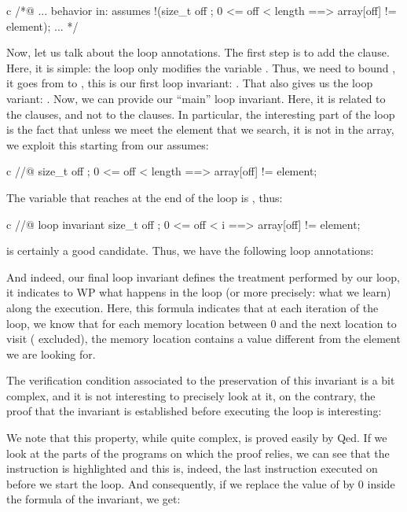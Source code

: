 \begin{CodeBlock}{c}
  /*@ ...
    behavior in:
      assumes !(\forall size_t off ; 0 <= off < length ==> array[off] != element);
    ...
  */
\end{CodeBlock}


Now, let us talk about the loop annotations. The first step is to add the
 clause. Here, it is simple: the loop only modifies the
variable . Thus, we need to bound , it goes from
 to , this is our first loop invariant:
. That also gives us the loop variant:
. Now, we can provide our ``main'' loop invariant. Here,
it is related to the  clauses, and not to the
 clauses. In particular, the interesting part of the loop is
the fact that unless we meet the element that we search, it is not in the array,
we exploit this starting from our  assumes:
\begin{CodeBlock}{c}
  //@ \forall size_t off ; 0 <= off < length ==> array[off] != element;
\end{CodeBlock}
The variable that reaches  at the end of the loop is
, thus:
\begin{CodeBlock}{c}
  //@ loop invariant \forall size_t off ; 0 <= off < i ==> array[off] != element;
\end{CodeBlock}
is certainly a good candidate. Thus, we have the following loop annotations:




And indeed, our final loop invariant defines the treatment performed by our
loop, it indicates to WP what happens in the loop (or more precisely: what we
learn) along the execution. Here, this formula indicates that at each iteration
of the loop, we know that for each memory location between 0 and the next
location to visit ( excluded), the memory location contains a
value different from the element we are looking for.


The verification condition associated to the preservation of this invariant is
a bit complex, and it is not interesting to precisely look at it,
on the contrary, the proof that the invariant is established before
executing the loop is interesting:




We note that this property, while quite complex, is proved easily
by Qed. If we look at the parts of the programs on which the proof
relies, we can see that the instruction  is highlighted
and this is, indeed, the last instruction executed on  before
we start the loop. And consequently, if we replace the value of
 by 0 inside the formula of the invariant, we get:


